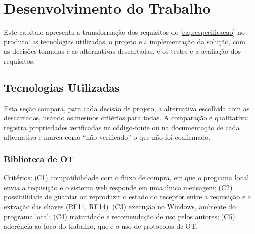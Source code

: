 \chapter{Desenvolvimento do Trabalho}\label{cap:desenvolvimento}

Este capítulo apresenta a transformação dos requisitos do
\autoref{cap:especificacao} no produto: as tecnologias utilizadas, o projeto e
a implementação da solução, com as decisões tomadas e as alternativas
descartadas, e os testes e a avaliação dos requisitos.

\section{Tecnologias Utilizadas}\label{sec:tecnologias}

Esta seção compara, para cada decisão de projeto, a alternativa escolhida com
as descartadas, usando os mesmos critérios para todas. A comparação é
qualitativa: registra propriedades verificadas no código-fonte ou na
documentação de cada alternativa e marca como ``não verificado'' o que não foi
confirmado.

\subsection{Biblioteca de OT}

Critérios:
(C1) compatibilidade com o fluxo de compra, em que o programa local envia a
requisição e o sistema web responde em uma única mensagem;
(C2) possibilidade de guardar ou reproduzir o estado do receptor entre a
requisição e a extração das chaves (RF11, RF14);
(C3) execução no Windows, ambiente do programa local;
(C4) maturidade e recomendação de uso pelos autores;
(C5) aderência ao foco do trabalho, que é o uso de protocolos de OT.

